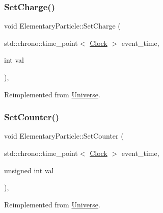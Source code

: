 \mbox{\label{classElementaryParticle_abbc6d3c58509c4121df55bfef716d2f1}} 
\subsubsection{\texorpdfstring{Set\+Charge()}{SetCharge()}}
{\footnotesize\ttfamily void Elementary\+Particle\+::\+Set\+Charge (\begin{DoxyParamCaption}\item[{std\+::chrono\+::time\+\_\+point$<$ \mbox{\hyperlink{universe_8h_a0ef8d951d1ca5ab3cfaf7ab4c7a6fd80}{Clock}} $>$}]{event\+\_\+time,  }\item[{int}]{val }\end{DoxyParamCaption})\hspace{0.3cm}{\ttfamily [inline]}, {\ttfamily [virtual]}}



Reimplemented from \mbox{\hyperlink{classUniverse_a3b3da7c86a7b75e5e5c0b7972ac82a87}{Universe}}.

\mbox{\label{classElementaryParticle_a141316fd968cce8ecc5aa11ce0757d63}} 
\subsubsection{\texorpdfstring{Set\+Counter()}{SetCounter()}}
{\footnotesize\ttfamily void Elementary\+Particle\+::\+Set\+Counter (\begin{DoxyParamCaption}\item[{std\+::chrono\+::time\+\_\+point$<$ \mbox{\hyperlink{universe_8h_a0ef8d951d1ca5ab3cfaf7ab4c7a6fd80}{Clock}} $>$}]{event\+\_\+time,  }\item[{unsigned int}]{val }\end{DoxyParamCaption})\hspace{0.3cm}{\ttfamily [inline]}, {\ttfamily [virtual]}}



Reimplemented from \mbox{\hyperlink{classUniverse_aa22202ae740eb1355529afcb13285e91}{Universe}}.

\mbox{\label{classElementaryParticle_a778ff8188ecb369e533521ed4f94b034}} 
